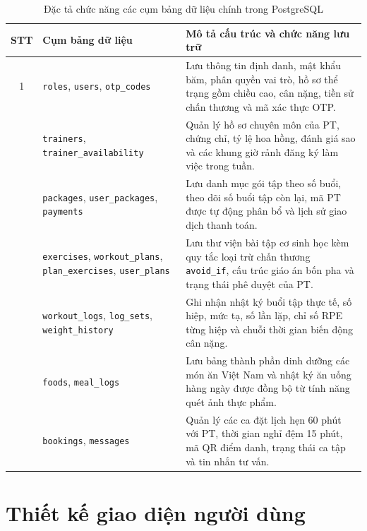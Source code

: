 \begin{table}[htbp]
\centering
\small
\caption{Đặc tả chức năng các cụm bảng dữ liệu chính trong PostgreSQL}
\label{tab:db_tables}
\begin{tabularx}{\textwidth}{c p{3.8cm} >{\raggedright\arraybackslash}X}
    \toprule
    \textbf{STT} & \textbf{Cụm bảng dữ liệu} & \textbf{Mô tả cấu trúc và chức năng lưu trữ} \\
    \midrule
    1 & \texttt{roles}, \texttt{users}, \texttt{otp\_codes} & Lưu thông tin định danh, mật khẩu băm, phân quyền vai trò, hồ sơ thể trạng gồm chiều cao, cân nặng, tiền sử chấn thương và mã xác thực OTP. \\
    \addlinespace[3pt]
    2 & \texttt{trainers}, \texttt{trainer\_availability} & Quản lý hồ sơ chuyên môn của PT, chứng chỉ, tỷ lệ hoa hồng, đánh giá sao và các khung giờ rảnh đăng ký làm việc trong tuần. \\
    \addlinespace[3pt]
    3 & \texttt{packages}, \texttt{user\_packages}, \texttt{payments} & Lưu danh mục gói tập theo số buổi, theo dõi số buổi tập còn lại, mã PT được tự động phân bổ và lịch sử giao dịch thanh toán. \\
    \addlinespace[3pt]
    4 & \texttt{exercises}, \texttt{workout\_plans}, \texttt{plan\_exercises}, \texttt{user\_plans} & Lưu thư viện bài tập cơ sinh học kèm quy tắc loại trừ chấn thương \texttt{avoid\_if}, cấu trúc giáo án bốn pha và trạng thái phê duyệt của PT. \\
    \addlinespace[3pt]
    5 & \texttt{workout\_logs}, \texttt{log\_sets}, \texttt{weight\_history} & Ghi nhận nhật ký buổi tập thực tế, số hiệp, mức tạ, số lần lặp, chỉ số RPE từng hiệp và chuỗi thời gian biến động cân nặng. \\
    \addlinespace[3pt]
    6 & \texttt{foods}, \texttt{meal\_logs} & Lưu bảng thành phần dinh dưỡng các món ăn Việt Nam và nhật ký ăn uống hàng ngày được đồng bộ từ tính năng quét ảnh thực phẩm. \\
    \addlinespace[3pt]
    7 & \texttt{bookings}, \texttt{messages} & Quản lý các ca đặt lịch hẹn 60 phút với PT, thời gian nghỉ đệm 15 phút, mã QR điểm danh, trạng thái ca tập và tin nhắn tư vấn. \\
    \bottomrule
\end{tabularx}
\end{table}

\section{Thiết kế giao diện người dùng}
\label{sec:thietke_ui}

